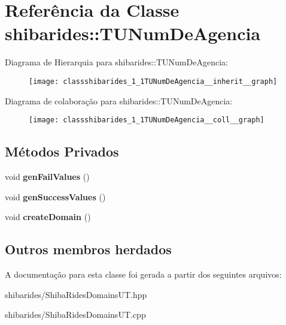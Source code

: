 \hypertarget{classshibarides_1_1TUNumDeAgencia}{}\section{Referência da Classe shibarides\+:\+:T\+U\+Num\+De\+Agencia}
\label{classshibarides_1_1TUNumDeAgencia}


Diagrama de Hierarquia para shibarides\+:\+:T\+U\+Num\+De\+Agencia\+:\nopagebreak
\begin{figure}[H]
\begin{center}
\leavevmode
\texttt{[image: classshibarides\_1\_1TUNumDeAgencia\_\_inherit\_\_graph]}
\end{center}
\end{figure}


Diagrama de colaboração para shibarides\+:\+:T\+U\+Num\+De\+Agencia\+:\nopagebreak
\begin{figure}[H]
\begin{center}
\leavevmode
\texttt{[image: classshibarides\_1\_1TUNumDeAgencia\_\_coll\_\_graph]}
\end{center}
\end{figure}
\subsection*{Métodos Privados}
\begin{DoxyCompactItemize}
\item 
void {\bfseries gen\+Fail\+Values} ()\hypertarget{classshibarides_1_1TUNumDeAgencia_aecfbd98390af518185f9c6119ef568bc}{}\label{classshibarides_1_1TUNumDeAgencia_aecfbd98390af518185f9c6119ef568bc}

\item 
void {\bfseries gen\+Success\+Values} ()\hypertarget{classshibarides_1_1TUNumDeAgencia_af61cbb64907d7ca35d3b55ec9ee5dc76}{}\label{classshibarides_1_1TUNumDeAgencia_af61cbb64907d7ca35d3b55ec9ee5dc76}

\item 
void {\bfseries create\+Domain} ()\hypertarget{classshibarides_1_1TUNumDeAgencia_a43bc2c0e66328fdfd5076cc2f7fd100d}{}\label{classshibarides_1_1TUNumDeAgencia_a43bc2c0e66328fdfd5076cc2f7fd100d}

\end{DoxyCompactItemize}
\subsection*{Outros membros herdados}


A documentação para esta classe foi gerada a partir dos seguintes arquivos\+:\begin{DoxyCompactItemize}
\item 
shibarides/Shiba\+Rides\+Domains\+U\+T.\+hpp\item 
shibarides/Shiba\+Rides\+Domains\+U\+T.\+cpp\end{DoxyCompactItemize}

